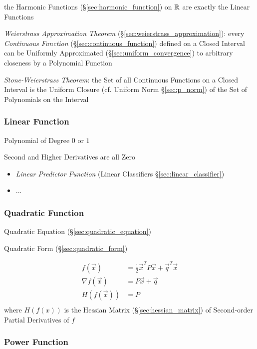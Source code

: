 the Harmonic Functions (\S\ref{sec:harmonic_function}) on $\mathbb{R}$ are
exactly the Linear Functions

\emph{Weierstrass Approximation Theorem}
(\S\ref{sec:weierstrass_approximation}): every \emph{Continuous Function}
(\S\ref{sec:continuous_function}) defined on a Closed Interval can be Uniformly
Approximated (\S\ref{sec:uniform_convergence}) to arbitrary closeness by a
Polynomial Function

\emph{Stone-Weierstrass Theorem}: the Set of all Continuous Functions on a
Closed Interval is the Uniform Closure (cf. Uniform Norm \S\ref{sec:p_norm}) of
the Set of Polynomials on the Interval



\subsubsection{Linear Function}\label{sec:linear_function}

Polynomial of Degree $0$ or $1$

Second and Higher Derivatives are all Zero

\begin{itemize}
  \item \emph{Linear Predictor Function} (Linear Classifiers
    \S\ref{sec:linear_classifier})
  \item ...
\end{itemize}



\subsubsection{Quadratic Function}\label{sec:quadratic_function}

\fist Quadratic Equation (\S\ref{sec:quadratic_equation})

\fist Quadratic Form (\S\ref{sec:quadratic_form})

\begin{align*}
  f(\vec{x})        & = \frac{1}{2}\vec{x}^T P \vec{x} + \vec{q}^T\vec{x} \\
  \nabla f(\vec{x}) & = P\vec{x} + \vec{q} \\
  H(f(\vec{x}))     & = P \\
\end{align*}
where $H(f(x))$ is the Hessian Matrix (\S\ref{sec:hessian_matrix}) of
Second-order Partial Derivatives of $f$



\subsubsection{Power Function}\label{sec:power_function}

